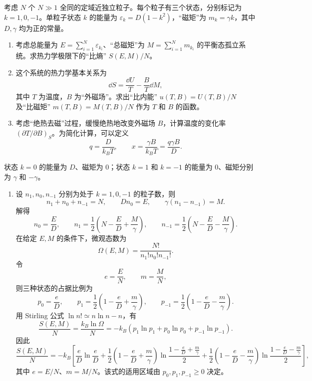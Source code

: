 \begin{question}[25 分]
考虑 $N$ 个 $N\gg 1$ 全同的定域近独立粒子。每个粒子有三个状态，分别标记为 $k=1,0,-1$。单粒子状态 $k$ 的能量为 $\varepsilon_k=D(1-k^2)$，``磁矩''为 $m_k=\gamma k$，其中 $D,\gamma$ 均为正的常量。
\begin{enumerate}
    \item 考虑总能量为 $E=\sum_{i=1}^N\varepsilon_{k_i}$、``总磁矩''为 $M=\sum_{i=1}^Nm_{k_i}$ 的平衡态孤立系统。求热力学极限下的``比熵'' $S(E,M)/N$。
    \item 这个系统的热力学基本关系为
    \[
        \dd{S}=\frac{\dd{U}}{T}-\frac{B}{T}\dd{M},
    \]
    其中 $T$ 为温度，$B$ 为``外磁场''。求出``比内能'' $u(T,B)=U(T,B)/N$ 及``比磁矩'' $m(T,B)=M(T,B)/N$ 作为 $T$ 和 $B$ 的函数。
    \item 考虑``绝热去磁''过程，缓慢绝热地改变外磁场 $B$，计算温度的变化率 $(\partial T/\partial B)_S$。为简化计算，可以定义
    \[
        q=\frac{D}{k_BT},
        \qquad
        x=\frac{\gamma B}{k_BT}=\frac{q\gamma B}{D}.
    \]
\end{enumerate}
\begin{solution}
状态 $k=0$ 的能量为 $D$、磁矩为 $0$；状态 $k=1$ 和 $k=-1$ 的能量为 $0$、磁矩分别为 $\gamma$ 和 $-\gamma$。
\begin{enumerate}
    \item 设 $n_1,n_0,n_{-1}$ 分别为处于 $k=1,0,-1$ 的粒子数，则
    \[
        n_1+n_0+n_{-1}=N,
        \qquad
        Dn_0=E,
        \qquad
        \gamma(n_1-n_{-1})=M.
    \]
    解得
    \[
        n_0=\frac{E}{D},
        \qquad
        n_1=\frac{1}{2}\left(N-\frac{E}{D}+\frac{M}{\gamma}\right),
        \qquad
        n_{-1}=\frac{1}{2}\left(N-\frac{E}{D}-\frac{M}{\gamma}\right).
    \]
    在给定 $E,M$ 的条件下，微观态数为
    \[
        \Omega(E,M)=\frac{N!}{n_1!n_0!n_{-1}!}.
    \]
    令
    \[
        e=\frac{E}{N},
        \qquad
        m=\frac{M}{N},
    \]
    则三种状态的占据比例为
    \[
        p_0=\frac{e}{D},
        \qquad
        p_1=\frac{1}{2}\left(1-\frac{e}{D}+\frac{m}{\gamma}\right),
        \qquad
        p_{-1}=\frac{1}{2}\left(1-\frac{e}{D}-\frac{m}{\gamma}\right).
    \]
    用 Stirling 公式 $\ln n!\simeq n\ln n-n$，有
    \[
        \frac{S(E,M)}{N}=\frac{k_B\ln\Omega}{N}
        =-k_B\left(p_1\ln p_1+p_0\ln p_0+p_{-1}\ln p_{-1}\right).
    \]
    因此
    \[
        \boxed{
        \frac{S(E,M)}{N}=-k_B\left[
        \frac{e}{D}\ln\frac{e}{D}
        +\frac{1}{2}\left(1-\frac{e}{D}+\frac{m}{\gamma}\right)
        \ln\frac{1-\frac{e}{D}+\frac{m}{\gamma}}{2}
        +\frac{1}{2}\left(1-\frac{e}{D}-\frac{m}{\gamma}\right)
        \ln\frac{1-\frac{e}{D}-\frac{m}{\gamma}}{2}
        \right],}
    \]
    其中 $e=E/N$、$m=M/N$。该式的适用区域由 $p_0,p_1,p_{-1}\ge 0$ 决定。


\end{enumerate}
\end{solution}
\end{question}
